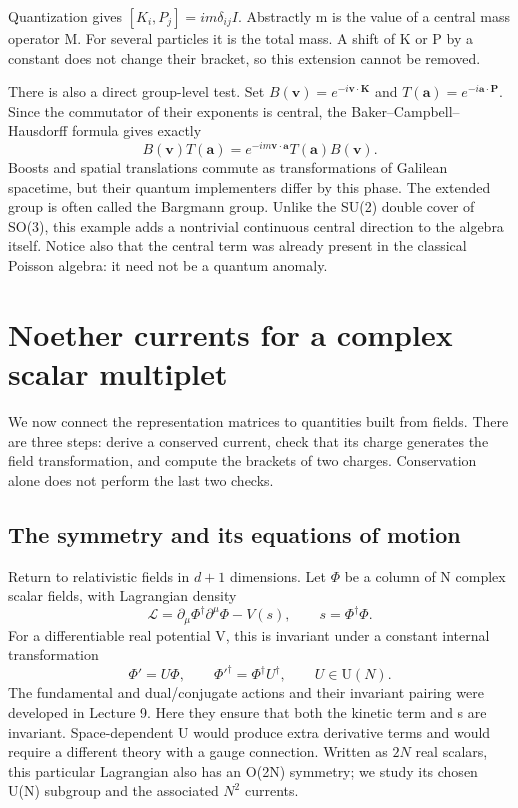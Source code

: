 \documentclass[11pt]{article}
\newcommand{\Lag}{\mathcal{L}}
\newcommand{\UU}{\mathrm{U}}
\begin{document}
Quantization gives \([K_i,P_j]=im\delta_{ij}I\). Abstractly m is the
value of a central mass operator M. For several particles it is the total
mass. A shift of K or P by a constant does not change their bracket, so
this extension cannot be removed.

There is also a direct group-level test. Set
\(B(\bm v)=e^{-i\bm v\cdot\bm K}\) and
\(T(\bm a)=e^{-i\bm a\cdot\bm P}\). Since the commutator of their
exponents is central, the Baker--Campbell--Hausdorff formula gives exactly
\begin{equation}
 B(\bm v)T(\bm a)
 =e^{-im\bm v\cdot\bm a}T(\bm a)B(\bm v).
 \label{eq:bargmann-phase}
\end{equation}
Boosts and spatial translations commute as transformations of Galilean
spacetime, but their quantum implementers differ by this phase. The
extended group is often called the Bargmann group. Unlike the SU(2)
double cover of SO(3), this example adds a nontrivial continuous central
direction to the algebra itself. Notice also that the central term was
already present in the classical Poisson algebra: it need not be a
quantum anomaly.

\section{Noether currents for a complex scalar multiplet}
\label{sec:currents}
We now connect the representation matrices to quantities built from
fields. There are three steps: derive a conserved current, check that
its charge generates the field transformation, and compute the brackets
of two charges. Conservation alone does not perform the last two checks.

\subsection{The symmetry and its equations of motion}
Return to relativistic fields in \(d+1\) dimensions. Let \(\Phi\) be a
column of N complex scalar fields, with Lagrangian density
\begin{equation}
 \Lag=\partial_\mu\Phi^\dagger\partial^\mu\Phi-V(s),
 \qquad s=\Phi^\dagger\Phi.
 \label{eq:multiplet-lagrangian}
\end{equation}
For a differentiable real potential V, this is invariant under a constant
internal transformation
\begin{equation}
 \Phi'=U\Phi,\qquad \Phi'^\dagger=\Phi^\dagger U^\dagger,
 \qquad U\in\UU(N).
 \label{eq:multiplet-action}
\end{equation}
The fundamental and dual/conjugate actions and their invariant pairing
were developed in Lecture 9. Here they ensure that both the
kinetic term and s are invariant.
Space-dependent U would produce extra derivative terms and would require
a different theory with a gauge connection.
Written as \(2N\) real scalars, this particular Lagrangian also has an
O(2N) symmetry; we study its chosen U(N) subgroup and the associated
\(N^2\) currents.
\end{document}
